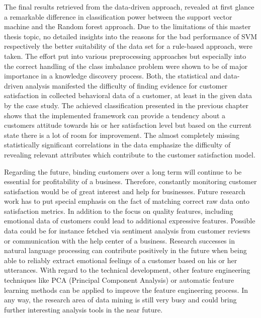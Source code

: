 The final results retrieved from the data-driven approach, revealed at first glance a remarkable difference in classification power between the support vector machine and the Random forest approach. Due to the limitations of this master thesis topic, no detailed insights into the reasons for the bad performance of SVM respectively the better suitability of the data set for a rule-based approach, were taken. The effort put into various preprocessing approaches but especially into the correct handling of the class imbalance problem were shown to be of major importance in a knowledge discovery process. Both, the statistical and data-driven analysis manifested the difficulty of finding evidence for customer satisfaction in collected behavioral data of a customer, at least in the given data by the case study. The achieved classification presented in the previous chapter shows that the implemented framework can provide a tendency about a customers attitude towards his or her satisfaction level but based on the current state there is a lot of room for improvement. The almost completely missing statistically significant correlations in the data emphasize the difficulty of revealing relevant attributes which contribute to the customer satisfaction model. 

Regarding the future, binding customers over a long term will continue to be essential for profitability of a business. Therefore, constantly monitoring customer satisfaction would be of great interest and help for businesses. Future research work has to put special emphasis on the fact of matching correct raw data onto satisfaction metrics. In addition to the focus on quality features, including emotional data of customers could lead to additional expressive features. Possible data could be for instance fetched via sentiment analysis from customer reviews or communication with the help center of a business. Research successes in natural language processing can contribute positively in the future when being able to reliably extract emotional feelings of a customer based on his or her utterances. With regard to the technical development, other feature engineering techniques like PCA (Principal Component Analysis) or automatic feature learning methods can be applied to improve the feature engineering process. In any way, the research area of data mining is still very busy and could bring further interesting analysis tools in the near future. 